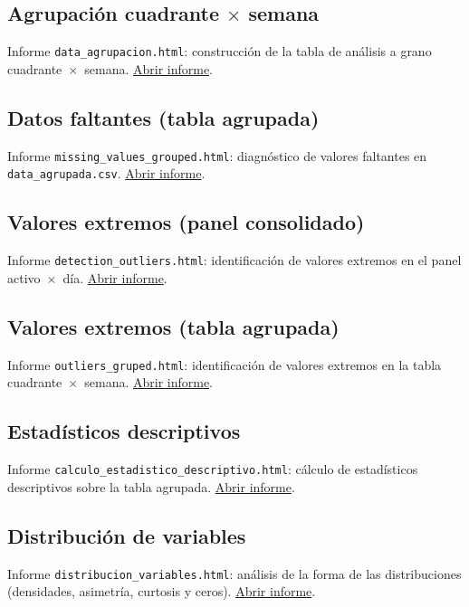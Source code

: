 \subsection{Agrupación cuadrante $\times$ semana}
\label{app:html-agrupacion}
Informe \texttt{data\_agrupacion.html}: construcción de la tabla de análisis a grano cuadrante~$\times$~semana.
\href{\urlagrupacion}{Abrir informe}.

\subsection{Datos faltantes (tabla agrupada)}
\label{app:html-faltantes-agrupada}
Informe \texttt{missing\_values\_grouped.html}: diagnóstico de valores faltantes en \texttt{data\_agrupada.csv}.
\href{\urlfaltantesagrupada}{Abrir informe}.

\subsection{Valores extremos (panel consolidado)}
\label{app:html-outliers}
Informe \texttt{detection\_outliers.html}: identificación de valores extremos en el panel activo~$\times$~día.
\href{\urldetectionoutliers}{Abrir informe}.

\subsection{Valores extremos (tabla agrupada)}
\label{app:html-outliers-agrupada}
Informe \texttt{outliers\_gruped.html}: identificación de valores extremos en la tabla cuadrante~$\times$~semana.
\href{\urloutliersagrupada}{Abrir informe}.

\subsection{Estadísticos descriptivos}
\label{app:html-descriptivos}
Informe \texttt{calculo\_estadistico\_descriptivo.html}: cálculo de estadísticos descriptivos sobre la tabla agrupada.
\href{\urlestadisticosdescriptivos}{Abrir informe}.

\subsection{Distribución de variables}
\label{app:html-distribucion}
Informe \texttt{distribucion\_variables.html}: análisis de la forma de las distribuciones (densidades, asimetría, curtosis y ceros).
\href{\urldistribucionvariables}{Abrir informe}.

